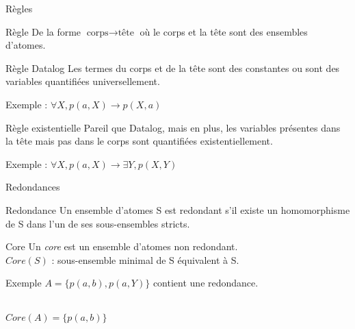 \begin{frame}{Règles}
    \begin{block}{Règle}
        De la forme $\mbox{corps} \rightarrow \mbox{tête}$ où le corps et la tête sont des ensembles d'atomes.
    \end{block}
    
    \begin{block}{Règle Datalog}
        Les termes du corps et de la tête sont des constantes ou sont des variables quantifiées universellement.
        \par Exemple : $\forall X, p(a,X) \rightarrow p(X,a)$
    \end{block}
    
    \begin{block}{Règle existentielle}
        Pareil que Datalog, mais en plus, les variables présentes dans la tête mais pas dans le corps sont quantifiées existentiellement.
        \par Exemple : $\forall X, p(a,X) \rightarrow \exists Y, p(X,Y)$
    \end{block}
\end{frame}

\begin{frame}{Redondances}
    \begin{block}{Redondance}
    Un ensemble d'atomes S est redondant s'il existe un homomorphisme de S dans l'un de ses sous-ensembles stricts.
    \end{block}
    \begin{block}{Core}
    Un \textit{core} est un ensemble d'atomes non redondant.\\
    $Core(S)$ : sous-ensemble minimal de S équivalent à S.
    \end{block}
    \begin{block}{Exemple}
        $A = \{p(a,b),p(a,Y)\}$ contient une redondance. \\ \\ 
        $Core(A) = \{p(a,b)\}$ \\
        \\
        
    \end{block}
\end{frame}